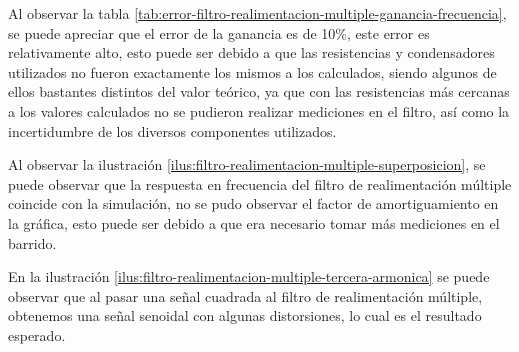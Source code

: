 Al observar la tabla \ref{tab:error-filtro-realimentacion-multiple-ganancia-frecuencia}, se puede apreciar que el error de la ganancia es de 10\%, este error es relativamente alto, esto puede ser debido a que las resistencias y condensadores utilizados no fueron exactamente los mismos a los calculados, siendo algunos de ellos bastantes distintos del valor teórico, ya que con las resistencias más cercanas a los valores calculados no se pudieron realizar mediciones en el filtro, así como la incertidumbre de los diversos componentes utilizados.

Al observar la ilustración \ref{ilus:filtro-realimentacion-multiple-superposicion}, se puede observar que la respuesta en frecuencia del filtro de realimentación múltiple coincide con la simulación, no se pudo observar el factor de amortiguamiento en la gráfica, esto puede ser debido a que era necesario tomar más mediciones en el barrido.


En la ilustración \ref{ilus:filtro-realimentacion-multiple-tercera-armonica} se puede observar que al pasar una señal cuadrada al filtro de realimentación múltiple, obtenemos una señal senoidal con algunas distorsiones, lo cual es el resultado esperado.